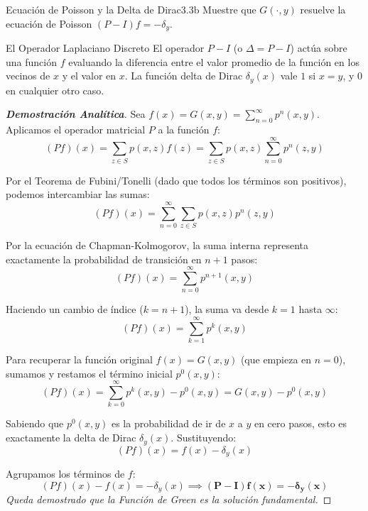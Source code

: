 \documentclass[10pt,a4paper]{article}
\begin{document}
\newpage


\begin{ejercicio}{Ecuación de Poisson y la Delta de Dirac}{3.3b}
    Muestre que $G(\cdot, y)$ resuelve la ecuación de Poisson $(P - I)f = -\delta_y$.
\end{ejercicio}

\vspace{2mm}

\begin{nota}{El Operador Laplaciano Discreto}
    El operador $P - I$ (o $\Delta = P - I$) actúa sobre una función $f$ evaluando la diferencia entre el valor promedio de la función en los vecinos de $x$ y el valor en $x$. La función delta de Dirac $\delta_y(x)$ vale $1$ si $x=y$, y $0$ en cualquier otro caso.
\end{nota}

\begin{proof}[\textbf{Demostración Analítica}]
    Sea $f(x) = G(x,y) = \sum_{n=0}^\infty p^n(x,y)$.
    Aplicamos el operador matricial $P$ a la función $f$:
    \[ (Pf)(x) = \sum_{z \in S} p(x,z) f(z) = \sum_{z \in S} p(x,z) \sum_{n=0}^\infty p^n(z,y) \]
    
    Por el Teorema de Fubini/Tonelli (dado que todos los términos son positivos), podemos intercambiar las sumas:
    \[ (Pf)(x) = \sum_{n=0}^\infty \sum_{z \in S} p(x,z) p^n(z,y) \]
    
    Por la ecuación de Chapman-Kolmogorov, la suma interna representa exactamente la probabilidad de transición en $n+1$ pasos:
    \[ (Pf)(x) = \sum_{n=0}^\infty p^{n+1}(x,y) \]
    
    Haciendo un cambio de índice ($k = n+1$), la suma va desde $k=1$ hasta $\infty$:
    \[ (Pf)(x) = \sum_{k=1}^\infty p^k(x,y) \]
    
    Para recuperar la función original $f(x) = G(x,y)$ (que empieza en $n=0$), sumamos y restamos el término inicial $p^0(x,y)$:
    \[ (Pf)(x) = \sum_{k=0}^\infty p^k(x,y) - p^0(x,y) = G(x,y) - p^0(x,y) \]
    
    Sabiendo que $p^0(x,y)$ es la probabilidad de ir de $x$ a $y$ en cero pasos, esto es exactamente la delta de Dirac $\delta_y(x)$. Sustituyendo:
    \[ (Pf)(x) = f(x) - \delta_y(x) \]
    
    Agrupamos los términos de $f$:
    \[ (Pf)(x) - f(x) = -\delta_y(x) \implies \mathbf{(P - I)f(x) = -\delta_y(x)} \]
    \textit{Queda demostrado que la Función de Green es la solución fundamental.}
\end{proof}
\end{document}
